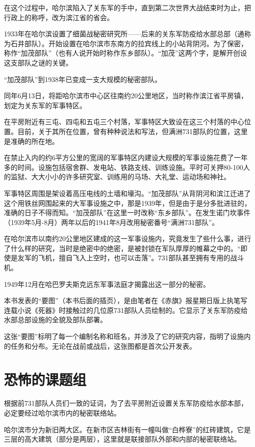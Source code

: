 \documentclass[a4paper,12pt,UTF8,twoside]{ctexbook}
\begin{document}
在这个过程中，哈尔滨陷入了关东军的手中，直到第二次世界大战结束时为止，把行政上的称呼，改为滨江省的省会。

1933年在哈尔滨设置了细菌战秘密研究所——后来的关东军防疫给水部总部（通称为石井部队）。开始设置在哈尔滨市东南方的拉宾线上的小站背阴河。为了保密，称作“加茂部队”（也有人说开始时称作东乡部队）。“加茂”这两个字，是解开创设这支部队之谜的关键。

“加茂部队”到1938年已变成一支大规模的秘密部队。

同年6月13日，将距哈尔滨市中心区往南约20公里地区，当时称作滨江省平房镇，划定为关东军的军事特区。

在平房附近有三屯、四屯和五屯三个村落，军事特区大致设在这三个村落的中心位置。目前，关于其所在位置，曾有种种说法和写法，但满洲731部队的位置，这里是准确的所在地。

在禁止入内的约6平方公里的宽阔的军事特区内建设大规模的军事设施花费了一年多的时间。设施包括宿舍群、发电站、铁路支线、训练设施。平时可关押80-100人的监狱、大大小小的许多研究室、训练用的马场、大礼堂、运动场和神社。

军事特区周围是架设着高压电线的土墙和壕沟。“加茂部队”从背阴河和滨江迁进了这个用铁丝网围起来的大军事设施之中，那是1939年，但是由于是分多批进驻的，准确的日子不得而知。“加茂部队”在这里一时改称“东乡部队”。在发生诺门坎事件（1939年5月-8月）两年以后的1941年8月改用秘密番号“满洲731部队”。

在哈尔滨市以南约20公里地区建成的这一军事设施内，究竟发生了些什么事，进行了什么样的研究，当时是绝密中的绝密，是被封锁在军队厚厚的帷幕之中的。“即使是友军的飞机，擅自飞入上空时，也可以击落”。731部队甚至拥有专用的战斗机。

1949年12月在哈巴罗夫斯克远东军事法庭才揭露出这一部分的秘密。

本书发表的“要图”（本书后面的插页），是由笔者在《赤旗》报星期日版上执笔写连载小说《死器》时接触过的几位原731部队人员绘制的。它显示了关东军防疫给水部总部设施的全貌及部队部署。

这张“要图”标明了每一个编制名称和班名，并涉及了它的研究内容，指明了设施内的任务和分布。无论在战前或战后，这张图都是首次公开发表。

\section{恐怖的课题组}

根据前731部队人员们一致的证词，为了去平房附近设置关东军防疫给水部本部，必定要经过哈尔滨市内的秘密联络站。

哈尔滨市分为新旧两大区。在新市区吉林街有一幢叫做“白桦寮”的红砖建筑，它是三层的高大建筑（部分是两层），这里就是联接部队外部和内部的秘密联络站。
\end{document}
